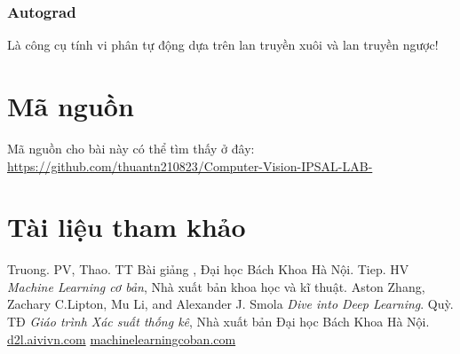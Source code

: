 \documentclass{article}
\begin{document}
 \subsubsection{Autograd}
 Là công cụ tính vi phân tự động dựa trên lan truyền xuôi và lan truyền ngược!
 \section{Mã nguồn}
 Mã nguồn cho bài này có thể tìm thấy ở đây: \\\url{https://github.com/thuantn210823/Computer-Vision-IPSAL-LAB-}
    \newpage
\section{Tài liệu tham khảo}
    \begin{thebibliography}{9}
        Truong. PV, Thao. TT Bài giảng , Đại học Bách Khoa Hà Nội.
        Tiep. HV \emph{Machine Learning cơ bản}, Nhà xuất bản khoa học và kĩ thuật.
        Aston Zhang, Zachary C.Lipton, Mu Li, and Alexander J. Smola \emph{Dive into Deep Learning}.
        Quỳ. TĐ \emph{Giáo trình Xác suất thống kê}, Nhà xuất bản Đại học Bách Khoa Hà Nội.
        \url{d2l.aivivn.com}
        \url{machinelearningcoban.com}

    \end{thebibliography}
\end{document}
